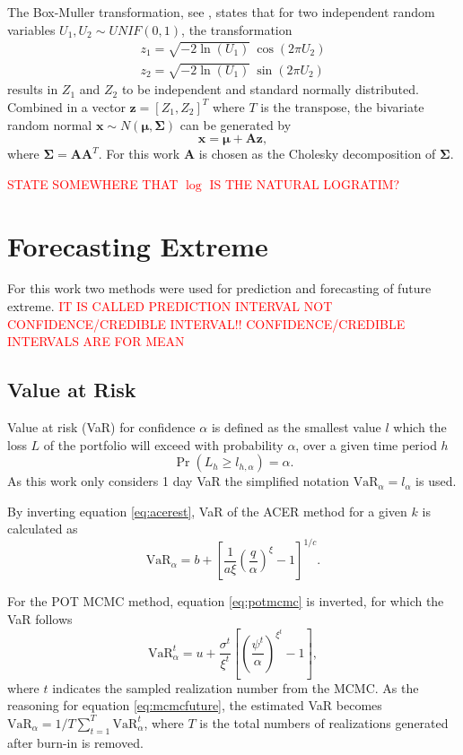 The Box-Muller transformation, see \cite{BM}, states that for two independent random variables $U_1,U_2 \sim UNIF(0,1)$, the transformation
\begin{align*}
z_1=\sqrt{-2 \ln(U_1)} \ \cos(2 \pi U_2)\\
z_2=\sqrt{-2 \ln(U_1)} \ \sin(2 \pi U_2)
\end{align*}
results in $Z_1$ and $Z_2$ to be independent and standard normally distributed. Combined in a vector $\boldsymbol{z}=[Z_1,Z_2]^T$ where $T$ is the transpose, the bivariate random normal $\boldsymbol{x} \sim N(\boldsymbol{\mu},\boldsymbol{\Sigma})$ can be generated by
\begin{equation}
\boldsymbol{x}=\boldsymbol{\mu}+\boldsymbol{A}\boldsymbol{z},
\end{equation}
where $\boldsymbol{\Sigma}=\boldsymbol{A}\boldsymbol{A}^T$. For this work $\boldsymbol{A}$ is chosen as the Cholesky decomposition of $\boldsymbol{\Sigma}$.

\textcolor{red}{STATE SOMEWHERE THAT $\log$ IS THE NATURAL LOGRATIM?}


\section{Forecasting Extreme}
For this work two methods were used for prediction and forecasting of future extreme. 
\textcolor{red}{IT IS CALLED PREDICTION INTERVAL NOT CONFIDENCE/CREDIBLE INTERVAL!! CONFIDENCE/CREDIBLE INTERVALS ARE FOR MEAN}
\subsection{Value at Risk}
Value at risk (VaR) for confidence $\alpha$ is defined as the smallest value $l$ which the loss $L$ of the portfolio will exceed with probability $\alpha$, over a given time period $h$
\begin{equation}
\label{eq:vardef}
\Pr(L_{h} \geq l_{h,\alpha})=\alpha.
\end{equation}
As this work only considers 1 day VaR the simplified notation $\text{VaR}_{\alpha}= l_{\alpha}$ is used.

By inverting equation \eqref{eq:acerest}, VaR of the ACER method for a given $k$ is calculated as
\begin{equation}
\text{VaR}_{\alpha}= b+\left[\frac{1}{a \xi} \left(\frac{q}{\alpha} \right)^{\xi}-1 \right]^{1/c}.
\end{equation}

For the POT MCMC method, equation \eqref{eq:potmcmc} is inverted, for which the VaR follows
\begin{equation}
\text{VaR}_{\alpha}^{t}=u+\frac{\sigma^t}{\xi^t} \left[ \left( \frac{\psi^t}{\alpha}\right)^{\xi^t} -1 \right],
\end{equation}
where $t$ indicates the sampled realization number from the MCMC. As the reasoning for equation \eqref{eq:mcmcfuture}, the estimated VaR becomes $\text{VaR}_\alpha=1/T \sum_{t=1}^T \text{VaR}_{\alpha}^{t}$, where $T$ is the total numbers of realizations generated after burn-in is removed.


